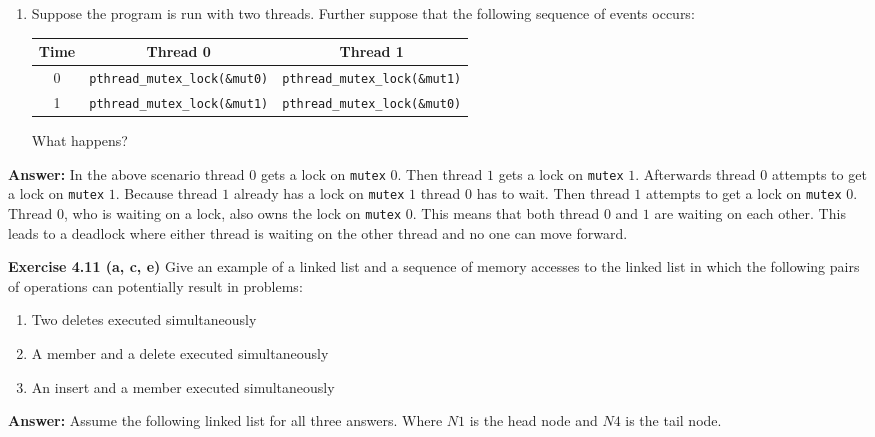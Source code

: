 \documentclass[12pt]{article}
\begin{document}
\begin{enumerate}[label=\alph*.]
    \item Suppose the program is run with two threads. Further suppose that the following sequence of events occurs:
    
    \begin{table}[h]
    \centering
    \begin{tabular}{|c|c|c|}
    \hline
    \textbf{Time} & \textbf{Thread 0} & \textbf{Thread 1} \\ \hline
    0 & \texttt{pthread\_mutex\_lock(\&mut0)} & \texttt{pthread\_mutex\_lock(\&mut1)} \\ \hline
    1 & \texttt{pthread\_mutex\_lock(\&mut1)} & \texttt{pthread\_mutex\_lock(\&mut0)} \\ \hline
    \end{tabular}
    \end{table}
    
    What happens?
\end{enumerate}

\textbf{Answer:} In the above scenario thread $0$ gets a lock on \texttt{mutex} $0$. Then thread $1$ gets a lock on \texttt{mutex} $1$. Afterwards thread $0$ attempts to get a lock on \texttt{mutex} $1$. Because thread $1$ already has a lock on \texttt{mutex} $1$ thread $0$ has to wait. Then thread $1$ attempts to get a lock on \texttt{mutex} $0$. Thread $0$, who is waiting on a lock, also owns the lock on \texttt{mutex} $0$. This means that both thread $0$ and $1$ are waiting on each other. This leads to a deadlock where either thread is waiting on the other thread and no one can move forward.

\pagebreak

\textbf{Exercise 4.11 (a, c, e)} Give an example of a linked list and a sequence of memory accesses to the linked list in which the following pairs of operations can potentially result in problems:
\begin{enumerate}[label=\alph*.]
    \item \addtocounter{enumi}{1} Two deletes executed simultaneously
    \item \addtocounter{enumi}{1} A member and a delete executed simultaneously
    \item \addtocounter{enumi}{1} An insert and a member executed simultaneously
\end{enumerate}

\textbf{Answer:} Assume the following linked list for all three answers. Where $N1$ is the head node and $N4$ is the tail node.
\end{document}
